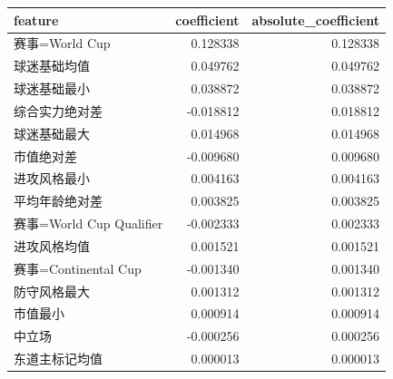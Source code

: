 \begin{tabular}{lrr}
\toprule
feature & coefficient & absolute\_coefficient \\
\midrule
赛事=World Cup & 0.128338 & 0.128338 \\
球迷基础均值 & 0.049762 & 0.049762 \\
球迷基础最小 & 0.038872 & 0.038872 \\
综合实力绝对差 & -0.018812 & 0.018812 \\
球迷基础最大 & 0.014968 & 0.014968 \\
市值绝对差 & -0.009680 & 0.009680 \\
进攻风格最小 & 0.004163 & 0.004163 \\
平均年龄绝对差 & 0.003825 & 0.003825 \\
赛事=World Cup Qualifier & -0.002333 & 0.002333 \\
进攻风格均值 & 0.001521 & 0.001521 \\
赛事=Continental Cup & -0.001340 & 0.001340 \\
防守风格最大 & 0.001312 & 0.001312 \\
市值最小 & 0.000914 & 0.000914 \\
中立场 & -0.000256 & 0.000256 \\
东道主标记均值 & 0.000013 & 0.000013 \\
\bottomrule
\end{tabular}
